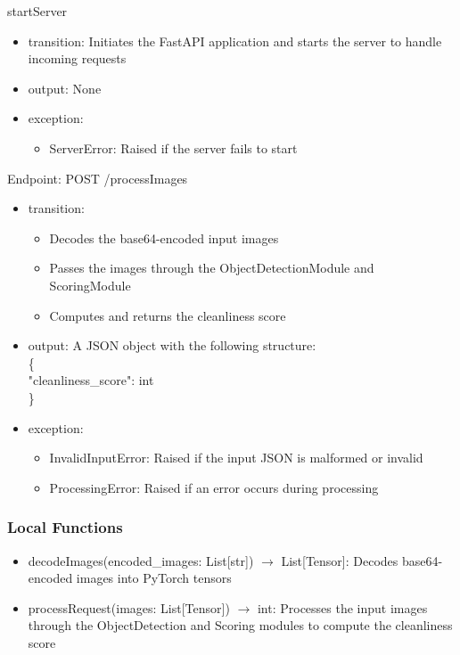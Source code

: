 \documentclass[12pt, titlepage]{article}
\begin{document}
\noindent startServer
\begin{itemize}
\item transition: Initiates the FastAPI application and starts the server to handle incoming requests
\item output: None
\item exception: 
\begin{itemize}
  \item ServerError: Raised if the server fails to start
\end{itemize}

\end{itemize}

\noindent Endpoint: POST /processImages
\begin{itemize}
\item transition:
\begin{itemize}
  \item Decodes the base64-encoded input images
  \item Passes the images through the ObjectDetectionModule and ScoringModule
  \item Computes and returns the cleanliness score
\end{itemize}
\item output: A JSON object with the following structure: \\ \{ \\"cleanliness{\_}score": int\\ \}
\item exception: 
\begin{itemize}
  \item InvalidInputError: Raised if the input JSON is malformed or invalid
  \item ProcessingError: Raised if an error occurs during processing
\end{itemize}

\end{itemize}


\subsubsection{Local Functions}

\begin{itemize}
  \item decodeImages(encoded{\_}images: List[str]) $\rightarrow$ List[Tensor]: Decodes base64-encoded images into PyTorch tensors
  \item processRequest(images: List[Tensor]) $\rightarrow$ int: Processes the input images through the ObjectDetection and Scoring modules to compute the cleanliness score
\end{itemize}
\end{document}
